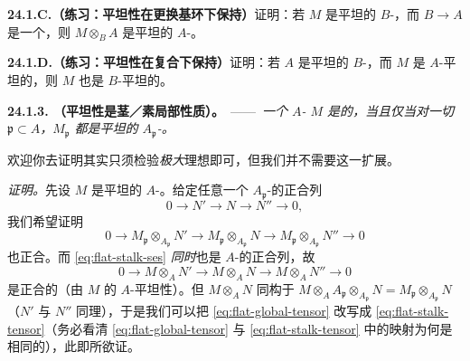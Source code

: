 \textbf{24.1.C.（练习：平坦性在更换基环下保持）}\quad 证明：若 $M$ 是平坦的 $B$-\trModule，而 $B\to A$ 是一个\trHomomorphism，则 $M\otimes_B A$ 是平坦的 $A$-\trModule。

\textbf{24.1.D.（练习：平坦性在复合下保持）}\quad 证明：若 $A$ 是平坦的 $B$-\trAlgebra，而 $M$ 是 $A$-平坦的，则 $M$ 也是 $B$-平坦的。

\textbf{24.1.3. \trhProposition{}（平坦性是茎／素局部性质）。}\ ——\ \emph{一个 $A$-\trModule{} $M$ 是\trFlat{}的，当且仅当对一切\trPrimeIdeal{} $\mathfrak{p}\subset A$，$M_{\mathfrak{p}}$ 都是平坦的 $A_{\mathfrak{p}}$-\trModule。}

欢迎你去证明其实只须检验\emph{极大}理想即可，但我们并不需要这一扩展。

\emph{证明。}\quad 先设 $M$ 是平坦的 $A$-\trModule。给定任意一个 $A_{\mathfrak{p}}$-\trModule{}的正合列
\[
\tag{24.1.3.1}\label{eq:flat-stalk-ses}
0 \longrightarrow N' \longrightarrow N \longrightarrow N'' \longrightarrow 0,
\]
我们希望证明
\[
\tag{24.1.3.2}\label{eq:flat-stalk-tensor}
0 \longrightarrow M_{\mathfrak{p}}\otimes_{A_{\mathfrak{p}}} N' \longrightarrow M_{\mathfrak{p}}\otimes_{A_{\mathfrak{p}}} N \longrightarrow M_{\mathfrak{p}}\otimes_{A_{\mathfrak{p}}} N'' \longrightarrow 0
\]
也正合。而 \eqref{eq:flat-stalk-ses} \emph{同时}也是 $A$-\trModule{}的正合列，故
\[
\tag{24.1.3.3}\label{eq:flat-global-tensor}
0 \longrightarrow M\otimes_A N' \longrightarrow M\otimes_A N \longrightarrow M\otimes_A N'' \longrightarrow 0
\]
是正合的（由 $M$ 的 $A$-平坦性）。但 $M\otimes_A N$ \trCanonical{}同构于 $M\otimes_A A_{\mathfrak{p}}\otimes_{A_{\mathfrak{p}}}N=M_{\mathfrak{p}}\otimes_{A_{\mathfrak{p}}}N$（$N'$ 与 $N''$ 同理），于是我们可以把 \eqref{eq:flat-global-tensor} 改写成 \eqref{eq:flat-stalk-tensor}（务必看清 \eqref{eq:flat-global-tensor} 与 \eqref{eq:flat-stalk-tensor} 中的映射为何是相同的），此即所欲证。

